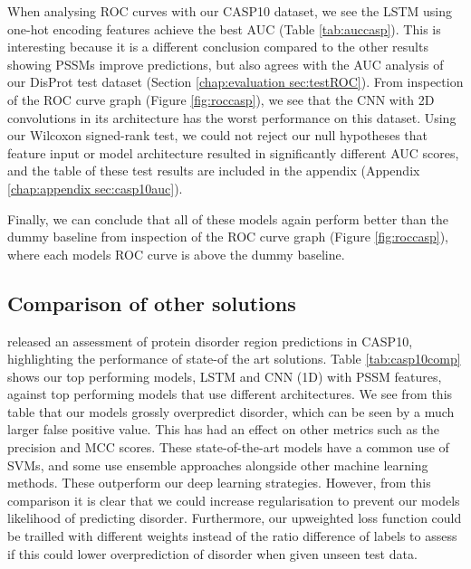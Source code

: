 \documentclass{l4proj}
\begin{document}
When analysing ROC curves with our CASP10 dataset, we see the LSTM using one-hot encoding features achieve the best AUC (Table \ref{tab:auccasp}). This is interesting because it is a different conclusion compared to the other results showing PSSMs improve predictions, but also agrees with the AUC analysis of our DisProt test dataset (Section \ref{chap:evaluation sec:testROC}). From inspection of the ROC curve graph (Figure \ref{fig:roccasp}), we see that the CNN with 2D convolutions in its architecture has the worst performance on this dataset. Using our Wilcoxon signed-rank test, we could not reject our null hypotheses that feature input or model architecture resulted in significantly different AUC scores, and the table of these test results are included in the appendix (Appendix \ref{chap:appendix sec:casp10auc}).

Finally, we can conclude that all of these models again perform better than the dummy baseline from inspection of the ROC curve graph (Figure \ref{fig:roccasp}), where each models ROC curve is above the dummy baseline.

\subsection{Comparison of other solutions}
\label{chap:evaluation sec:CASP10comp}
\cite{Monastyrskyy:14} released an assessment of protein disorder region predictions in CASP10, highlighting the performance of state-of the art solutions. Table \ref{tab:casp10comp} shows our top performing models, LSTM and CNN (1D) with PSSM features, against top performing models that use different architectures. We see from this table that our models grossly overpredict disorder, which can be seen by a much larger false positive value. This has had an effect on other metrics such as the precision and MCC scores. These state-of-the-art models have a common use of SVMs, and some use ensemble approaches alongside other machine learning methods. These outperform our deep learning strategies. However, from this comparison it is clear that we could increase regularisation to prevent our models likelihood of predicting disorder. Furthermore, our upweighted loss function could be trailled with different weights instead of the ratio difference of labels to assess if this could lower overprediction of disorder when given unseen test data.
\end{document}
